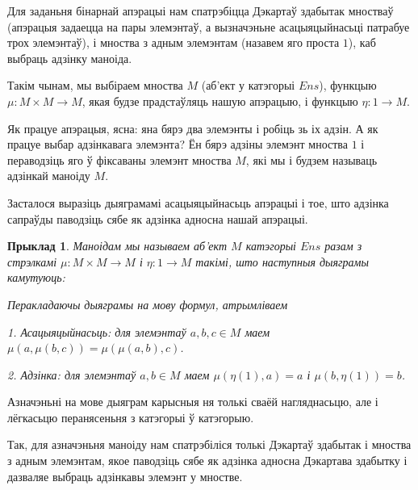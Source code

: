 \documentclass[a4paper,12pt]{book}
\newtheorem{example}{Прыклад}[section]
\begin{document}
Для заданьня бінарнай апэрацыі нам спатрэбіцца Дэкартаў здабытак
мностваў (апэрацыя задаецца на пары элемэнтаў, а вызначэньне
асацыяцыйнасьці патрабуе трох элемэнтаў), і мноства з адным
элемэнтам (назавем яго проста $1$), каб выбраць адзінку маноіда.

Такім чынам, мы выбіраем мноства $M$ (аб'ект у катэгорыі $Ens$),
функцыю $\mu: M \times M \rightarrow M$, якая будзе прадстаўляць
нашую апэрацыю, і функцыю $\eta: 1 \rightarrow M$.

Як працуе апэрацыя, ясна: яна бярэ два элемэнты і робіць зь іх
адзін. А як працуе выбар адзінкавага элемэнта? Ён бярэ адзіны
элемэнт мноства $1$ і пераводзіць яго ў фіксаваны элемэнт мноства
$M$, які мы і будзем называць адзінкай маноіду $M$.

Засталося выразіць дыяграмамі асацыяцыйнасьць апэрацыі і тое, што
адзінка сапраўды паводзіць сябе як адзінка адносна нашай апэрацыі.

\begin{example}
  Маноідам мы называем аб'ект $M$ катэгорыі $Ens$ разам з стрэлкамі
  $\mu: M \times M \rightarrow M$ і $\eta: 1 \rightarrow M$ такімі,
  што наступныя дыяграмы камутуюць:



  Перакладаючы дыяграмы на мову формул, атрымліваем

  1. Асацыяцыйнасьць: для элемэнтаў $a, b, c \in M$ маем $\mu(a,
  \mu(b, c)) = \mu(\mu(a, b), c)$.

  2. Адзінка: для элемэнтаў $a, b \in M$ маем $\mu(\eta(1), a) = a$
  і $\mu(b, \eta(1)) = b$.
\end{example}

Азначэньні на мове дыяграм карысныя ня толькі сваёй нагляднасьцю,
але і лёгкасьцю перанясеньня з катэгорыі ў катэгорыю.

Так, для азначэньня маноіду нам спатрэбіліся толькі Дэкартаў
здабытак і мноства з адным элемэнтам, якое паводзіць сябе як
адзінка адносна Дэкартава здабытку і дазваляе выбраць адзінкавы
элемэнт у мностве.
\end{document}
